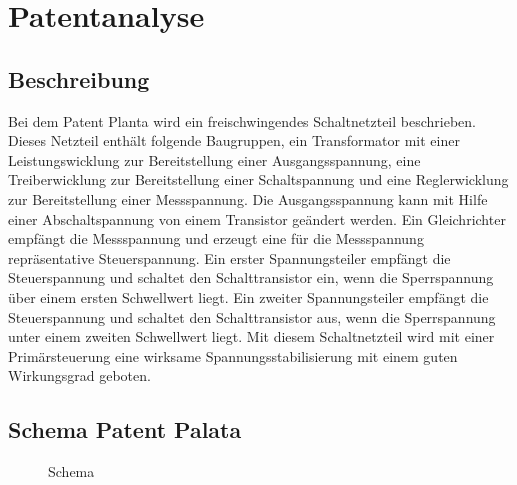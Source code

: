 \section{Patentanalyse}\label{sec:Patentanalyse}
\subsection{Beschreibung}\label{subsec:Beschreibung}
Bei dem Patent Planta wird ein freischwingendes Schaltnetzteil beschrieben. Dieses Netzteil enthält folgende Baugruppen, ein Transformator mit einer Leistungswicklung zur Bereitstellung einer Ausgangsspannung, eine Treiberwicklung zur Bereitstellung einer Schaltspannung und eine Reglerwicklung zur Bereitstellung einer Messspannung. Die Ausgangsspannung kann mit Hilfe einer Abschaltspannung von einem Transistor geändert werden. Ein Gleichrichter empfängt die Messspannung und erzeugt eine für die Messspannung repräsentative Steuerspannung. Ein erster Spannungsteiler empfängt die Steuerspannung und schaltet den Schalttransistor ein, wenn die Sperrspannung über einem ersten Schwellwert liegt. Ein zweiter Spannungsteiler empfängt die Steuerspannung und schaltet den Schalttransistor aus, wenn die Sperrspannung unter einem zweiten Schwellwert liegt. Mit diesem Schaltnetzteil wird mit einer Primärsteuerung eine wirksame Spannungsstabilisierung mit einem guten Wirkungsgrad geboten.


\subsection{Schema Patent Palata}\label{subsec:Schema}
\begin{figure}[h!]
	\centering
{}
	\caption{Schema}
	\label{fig:Schema}
\end{figure} 
\newpage
